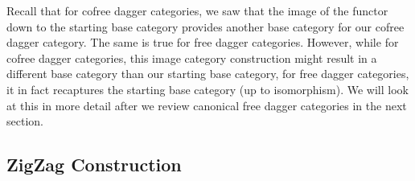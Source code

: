 \documentclass[10pt]{article}
\begin{document}
Recall that for cofree dagger categories, we saw that the image of the functor down to the starting base category provides another base category for our cofree dagger category. The same is true for free dagger categories. However, while for cofree dagger categories, this image category construction might result in a different base category than our starting base category, for free dagger categories, it in fact recaptures the starting base category (up to isomorphism). We will look at this in more detail after we review canonical free dagger categories in the next section. 

\subsection{ZigZag Construction}\label{sec:free-canonical}
\end{document}
